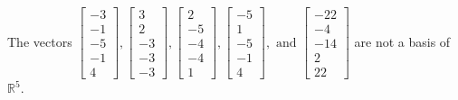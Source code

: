 \begin{exercise}
\begin{exerciseStatement}
  \end{exerciseStatement}
  \begin{exerciseAnswer}
   The vectors \(\left[\begin{array}{r}
-3 \\
-1 \\
-5 \\
-1 \\
4
\end{array}\right] , \left[\begin{array}{r}
3 \\
2 \\
-3 \\
-3 \\
-3
\end{array}\right] , \left[\begin{array}{r}
2 \\
-5 \\
-4 \\
-4 \\
1
\end{array}\right] , \left[\begin{array}{r}
-5 \\
1 \\
-5 \\
-1 \\
4
\end{array}\right] , \text{ and } \left[\begin{array}{r}
-22 \\
-4 \\
-14 \\
2 \\
22
\end{array}\right]\) 
  	 are not  a basis of \(\mathbb{R}^5\).
  


  \end{exerciseAnswer}
\end{exercise}